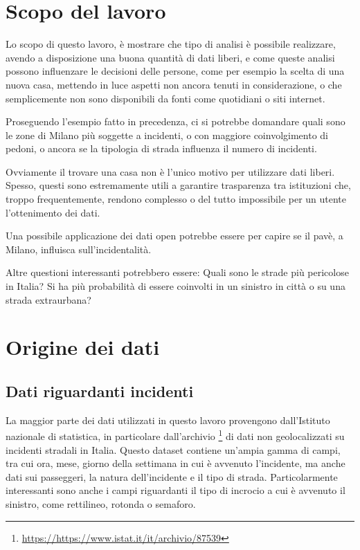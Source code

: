 \documentclass[a4paper]{report}
\begin{document}

\section{Scopo del lavoro}

Lo scopo di questo lavoro, è mostrare che tipo di analisi è possibile realizzare, 
avendo a disposizione 
una buona quantità di dati liberi, e come queste analisi possono influenzare le decisioni delle 
persone, come per esempio la scelta di una nuova casa, mettendo in luce aspetti non ancora 
tenuti in considerazione, o che semplicemente non sono disponibili da fonti 
come quotidiani o siti internet.

Proseguendo l'esempio fatto in precedenza, ci si potrebbe domandare quali sono le zone di Milano 
più soggette a incidenti, o con maggiore coinvolgimento di pedoni, o ancora se la tipologia di strada 
influenza il numero di incidenti.

Ovviamente il trovare una casa non è l'unico motivo per utilizzare dati liberi. 
Spesso, questi sono estremamente utili a garantire trasparenza tra istituzioni che, troppo frequentemente, 
rendono complesso o del tutto impossibile per un utente l'ottenimento dei dati.

Una possibile applicazione dei dati open potrebbe essere per capire se il pavè, a Milano, 
influisca sull'incidentalità.

Altre questioni interessanti potrebbero essere: 
Quali sono le strade più pericolose in Italia? 
Si ha più probabilità di essere coinvolti in un sinistro in città o su una strada extraurbana? 


\section{Origine dei dati}

\subsection{Dati riguardanti incidenti}
La maggior parte dei dati utilizzati in questo lavoro provengono 
dall'Istituto nazionale di statistica, in particolare dall'archivio
\footnote{\url{https://https://www.istat.it/it/archivio/87539}}
di dati non geolocalizzati su incidenti stradali in Italia.
Questo dataset contiene un'ampia gamma di campi, tra cui ora, 
mese, giorno della settimana in cui è avvenuto l'incidente, 
ma anche dati sui passeggeri, la natura dell'incidente e il tipo di strada. 
Particolarmente interessanti sono anche i campi riguardanti il tipo di incrocio a cui è 
avvenuto il sinistro, come rettilineo, rotonda o semaforo.
\end{document}
